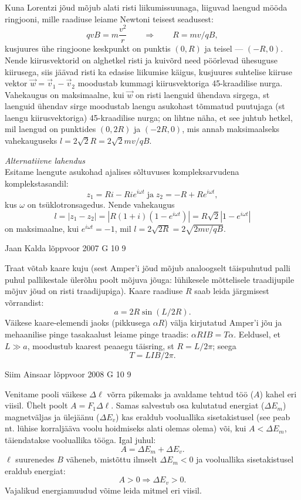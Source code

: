 \documentclass[11pt, twoside]{article}
\begin{document}
{{\ifSolution
Kuna Lorentzi jõud mõjub alati risti liikumissuunaga, liiguvad laengud mööda ringjooni, mille raadiuse leiame Newtoni teisest seadusest:
\[
qvB=m\frac{v^2}{r} \qquad \Rightarrow \qquad R=mv/qB,
\]
kusjuures ühe ringjoone keskpunkt on punktis $(0,R)$ ja teisel --- $(-R,0)$.
Nende kiirusvektorid on alghetkel risti ja kuivõrd need pöörlevad ühesuguse kiirusega, siis jäävad risti ka edasise liikumise käigus,
kusjuures suhtelise kiiruse vektor $\vec w= \vec v_1-\vec v_2$ moodustab kummagi kiirusvektoriga 45-kraadilise nurga. Vahekaugus on
maksimaalne, kui $\vec w$ on risti laenguid ühendava sirgega, st laenguid ühendav sirge moodustab laengu asukohast tõmmatud
puutujaga (st laengu kiirusvektoriga) 45-kraadilise nurga; on lihtne näha, et see juhtub hetkel, mil laengud on punktides $(0,2R)$ ja $(-2R,0)$, mis
annab maksimaalseks vahekauguseks $l=2\sqrt 2 R =2\sqrt 2mv/qB$.

\vspace{0.5\baselineskip}

{\em Alternatiivne lahendus}\\
Esitame laengute asukohad ajalises sõltuvuses kompleksarvudena komplekstasandil:
$$z_1=Ri - Rie^{i\omega t}\;\mbox{ja}\; z_2= -R + Re^{i\omega t},$$ kus
$\omega$ on tsüklotronsagedus. Nende vahekaugus
$$l=|z_1-z_2|=|R(1+i)(1-e^{i\omega t})|=R\sqrt 2|1-e^{i\omega t}|$$ on maksimaalne, kui $e^{i\omega t}=-1$, mil $l=2\sqrt{2R}=2\sqrt{2mv/qB}$.
\fi
}

{Jaan Kalda} %
{lõppvoor} %
{2007} %
{G 10} %
{9} %
{

\ifSolution
Traat võtab kaare kuju (sest Amper’i jõud mõjub analoogselt täispuhutud palli puhul pallikestale ülerõhu poolt mõjuva jõuga: lühikesele mõttelisele traadijupile mõjuv jõud on risti traadijupiga). Kaare raadiuse $R$ saab leida järgmisest võrrandist:
\[
a = 2R \sin (L/2R).
\]
Väikese kaare-elemendi jaoks (pikkusega $\alpha R$) välja kirjutatud Amper’i jõu ja mehaanilise pinge tasakaalust leiame pinge traadis: $\alpha RIB = T \alpha$. Eeldusel, et $L \gg a$, moodustub kaarest peaaegu täisring, st $R = L/2\pi$; seega
\[
T = LIB/2\pi.
\]
\fi
}

{Siim Ainsaar} %
{lõppvoor} %
{2008} %
{G 10} %
{9} %
{

\ifSolution
Venitame pooli väikese $\Delta \ell$ võrra pikemaks ja avaldame tehtud töö ($A$) kahel eri viisil. Ühelt poolt $A = F_1\Delta \ell$. Samas salvestub osa kulutatud energiat ($\Delta E_m$) magnetväljas ja ülejäänu ($\Delta E_v$) kas eraldub vooluallika sisetakistusel (see peab nt. lühise korraljääva voolu hoidmiseks alati olemas olema) või, kui $A < \Delta E_m$, täiendatakse vooluallika tööga. Igal juhul:
\[
A = \Delta E_m + \Delta E_v.
\]
$\ell$ suurenedes $B$ väheneb, mistõttu ilmselt $\Delta E_m < 0$ ja vooluallika sisetakistusel eraldub energiat:
\[
A > 0 \Longrightarrow \Delta E_v > 0.
\]
Vajalikud energiamuudud võime leida mitmel eri viisil.

}}
\end{document}

